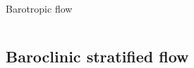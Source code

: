 \documentclass{beamer}
\newcommand{\pd}[1]{\partial_{#1}}
\newcommand{\pdd}[1]{\partial_{#1}^2}
\begin{document}
\begin{frame}{Barotropic flow}
\begin{columns}
\end{columns}
\end{frame}

\subsection{Baroclinic stratified flow}


\end{document}
